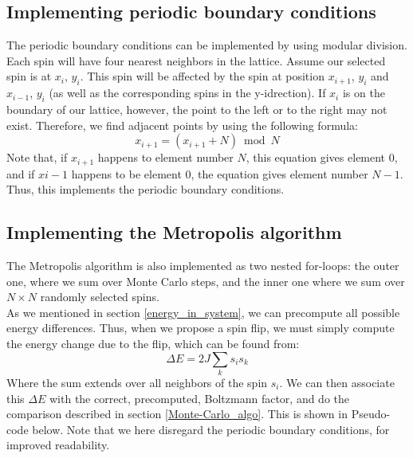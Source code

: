 \documentclass[a4paper, 10pt]{article}
\begin{document}
\subsection{Implementing periodic boundary conditions}
The periodic boundary conditions can be implemented by using modular division. Each spin will have four nearest neighbors in the lattice. Assume our selected spin is at $x_i$, $y_i$. This spin will be affected by the spin at position $x_{i+1}$, $y_i$ and $x_{i-1}$, $y_i$ (as well as the corresponding spins in the y-idrection). If $x_i$ is on the boundary of our lattice, however, the point to the left or to the right may not exist. Therefore, we find adjacent points by using the following formula:
\begin{equation}\label{eq:modular_arithmetic}
x_{i+1}=(x_{i+1}+N) \bmod N
\end{equation}
Note that, if $x_{i+1}$ happens to element number $N$, this equation gives element 0, and if $x{i-1}$ happens to be element 0, the equation gives element number $N-1$. Thus, this implements the periodic boundary conditions.
\subsection{Implementing the Metropolis algorithm}\label{metropolis_algo_implementation}
The Metropolis algorithm is also implemented as two nested for-loops: the outer one, where we sum over Monte Carlo steps, and the inner one where we sum over $N\times N$ randomly selected spins.\\
\linebreak
As we mentioned in section \ref{energy_in_system}, we can precompute all possible energy differences. Thus, when we propose a spin flip, we must simply compute the energy change due to the flip, which can be found from:
$$\Delta E = 2J\sum_k s_is_k$$
Where the sum extends over all neighbors of the spin $s_i$. We can then associate this $\Delta E$ with the correct, precomputed, Boltzmann factor, and do the comparison described in section \ref{Monte-Carlo_algo}.  This is shown in Pseudo-code below. Note that we here disregard the periodic boundary conditions, for improved readability. 

\end{document}
